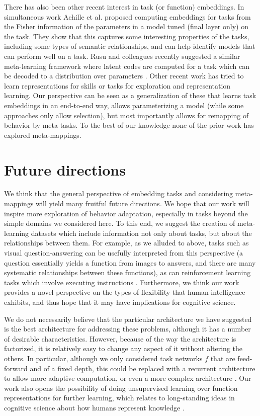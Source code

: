\documentclass{article}
\begin{document}
There has also been other recent interest in task (or function) embeddings. In simultaneous work Achille et al. \citep{Achille2019} proposed computing embeddings for tasks from the Fisher information of the parameters in a model tuned (final layer only) on the task. They show that this captures some interesting properties of the tasks, including some types of semantic relationships, and can help identify models that can perform well on a task. Rusu and colleagues recently suggested a similar meta-learning framework where latent codes are computed for a task which can be decoded to a distribution over parameters \citep{Rusu2019}. Other recent work has tried to learn representations for skills \citep[e.g.][]{Eysenbach2019} or tasks \citep[e.g.]{Hsu2019} for exploration and representation learning. Our perspective can be seen as a generalization of these that learns task embeddings in an end-to-end way, allows parameterizing a model (while some approaches only allow selection), but most importantly allows for remapping of behavior by meta-tasks. To the best of our knowledge none of the prior work has explored meta-mappings. \par
\section{Future directions}
We think that the general perspective of embedding tasks and considering meta-mappings will yield many fruitful future directions. We hope that our work will inspire more exploration of behavior adaptation, especially in tasks beyond the simple domains we considered here. To this end, we suggest the creation of meta-learning datasets which include information not only about tasks, but about the relationships between them. For example, as we alluded to above, tasks such as visual question-answering \citep[e.g.][]{Antol2015} can be usefully interpreted from this perspective (a question essentially yields a function from images to answers, and there are many systematic relationships between these functions), as can reinforcement learning tasks which involve executing instructions \citep[e.g.][]{Hermann2017, Co-Reyes2019}. Furthermore, we think our work provides a novel perspective on the types of flexibility that human intelligence exhibits, and thus hope that it may have implications for cognitive science. \par 
We do not necessarily believe that the particular architecture we have suggested is the best architecture for addressing these problems, although it has a number of desirable characteristics. However, because of the way the architecture is factorized, it is relatively easy to change any aspect of it without altering the others. In particular, although we only considered task networks $f$ that are feed-forward and of a fixed depth, this could be replaced with a recurrent architecture to allow more adaptive computation, or even a more complex architecture \citep[e.g.][]{Reed2015, Graves2016}. Our work also opens the possibility of doing unsupervised learning over function representations for further learning, which relates to long-standing ideas in cognitive science about how humans represent knowledge \citep{Clark1993}. \par 
\end{document}
